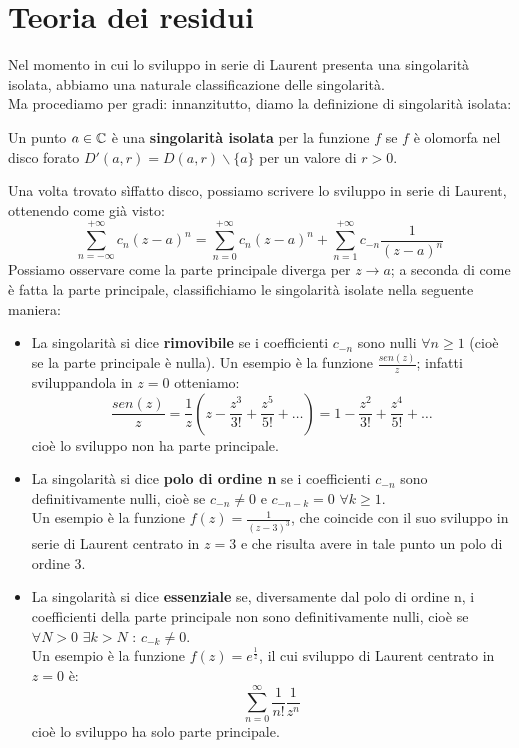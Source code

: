 \chapter{Teoria dei residui}

Nel momento in cui lo sviluppo in serie di Laurent presenta una singolarità isolata, abbiamo una naturale classificazione delle singolarità.\\Ma procediamo per gradi: innanzitutto, diamo la definizione di singolarità isolata:
\begin{definizione}
Un punto $a \in \mathbb{C}$ è una \textbf{singolarità isolata} per la funzione $f$ se $f$ è olomorfa nel disco forato $D'(a,r)=D(a,r) \backslash \{a\}$ per un valore di $r>0$.
\end{definizione}
Una volta trovato sìffatto disco, possiamo scrivere lo sviluppo in serie di Laurent, ottenendo come già visto:
$$\sum_{n=-\infty} ^{+\infty} c_n (z-a)^n=\sum_{n=0} ^{+\infty} c_n (z-a)^n + \sum_{n=1} ^{+\infty} c_{-n} \frac{1}{(z-a)^n}$$
Possiamo osservare come la parte principale diverga per $z \to a$; a seconda di come è fatta la parte principale, classifichiamo le singolarità isolate nella seguente maniera:
\begin{itemize} 
\item La singolarità si dice \textbf{rimovibile} se i coefficienti $c_{-n}$ sono  nulli $\forall n \geq 1$ (cioè se la parte principale è nulla). Un esempio è la funzione $\frac{sen(z)}{z}$; infatti sviluppandola in $z=0$ otteniamo:
$$\frac{sen(z)}{z}= \frac{1}{z} \left(z-\frac{z^3}{3!} + \frac{z^5}{5!}+ \dots \right)=1-\frac{z^2}{3!} + \frac{z^4}{5!}+ \dots$$
cioè lo sviluppo non ha parte principale.
\item La singolarità si dice \textbf{polo di ordine n} se i coefficienti $c_{-n}$ sono definitivamente nulli, cioè se $c_{-n} \neq 0$ e $c_{-n-k}=0$ $\forall k \geq 1$. \\
Un esempio è la funzione $f(z)=\frac{1}{(z-3)^3}$, che coincide con il suo sviluppo in serie di Laurent centrato in $z=3$ e che risulta avere in tale punto un polo di ordine 3.
\item  La singolarità si dice \textbf{essenziale} se, diversamente dal polo di ordine n, i coefficienti della parte principale non sono definitivamente nulli, cioè se $\forall N>0$ $\exists k>N$ : $c_{-k} \neq 0$. \\ Un esempio è la funzione $f(z)=e^{\frac{1}{z}}$, il cui sviluppo di Laurent centrato in $z=0$ è:
$$\sum_{n=0} ^{\infty} \frac{1}{n!} \frac{1}{z^n}$$
cioè lo sviluppo ha solo parte principale.
\end{itemize}
